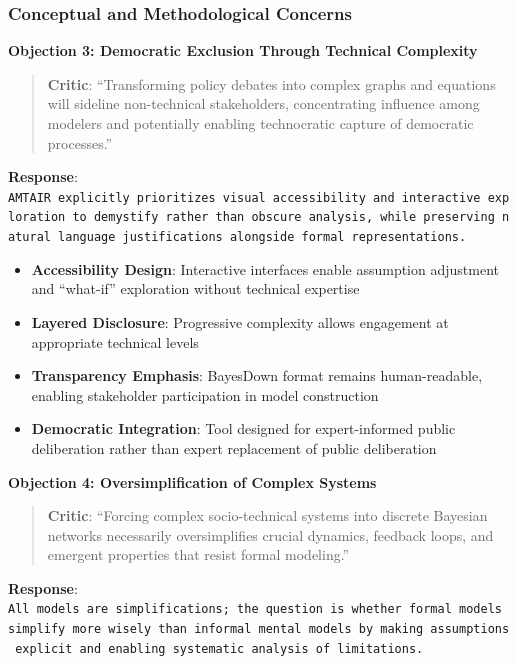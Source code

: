 \documentclass[
  11pt,
  letterpaper,
]{book}
\providecommand{\tightlist}{%
  \setlength{\itemsep}{0pt}\setlength{\parskip}{0pt}}
\begin{document}
\subsubsection{Conceptual and Methodological
Concerns}\label{sec-conceptual-concerns}

\textbf{Objection 3: Democratic Exclusion Through Technical Complexity}

\begin{quote}
\textbf{Critic}: ``Transforming policy debates into complex graphs and
equations will sideline non-technical stakeholders, concentrating
influence among modelers and potentially enabling technocratic capture
of democratic processes.''
\end{quote}

\textbf{Response}:
\texttt{AMTAIR\ explicitly\ prioritizes\ visual\ accessibility\ and\ interactive\ exploration\ to\ demystify\ rather\ than\ obscure\ analysis,\ while\ preserving\ natural\ language\ justifications\ alongside\ formal\ representations.}

\begin{itemize}
\tightlist
\item
  \textbf{Accessibility Design}: Interactive interfaces enable
  assumption adjustment and ``what-if'' exploration without technical
  expertise
\item
  \textbf{Layered Disclosure}: Progressive complexity allows engagement
  at appropriate technical levels
\item
  \textbf{Transparency Emphasis}: BayesDown format remains
  human-readable, enabling stakeholder participation in model
  construction
\item
  \textbf{Democratic Integration}: Tool designed for expert-informed
  public deliberation rather than expert replacement of public
  deliberation
\end{itemize}

\textbf{Objection 4: Oversimplification of Complex Systems}

\begin{quote}
\textbf{Critic}: ``Forcing complex socio-technical systems into discrete
Bayesian networks necessarily oversimplifies crucial dynamics, feedback
loops, and emergent properties that resist formal modeling.''
\end{quote}

\textbf{Response}:
\texttt{All\ models\ are\ simplifications;\ the\ question\ is\ whether\ formal\ models\ simplify\ more\ wisely\ than\ informal\ mental\ models\ by\ making\ assumptions\ explicit\ and\ enabling\ systematic\ analysis\ of\ limitations.}
\end{document}
